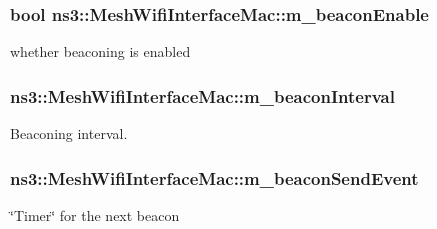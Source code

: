 \subsubsection[{\texorpdfstring{m\+\_\+beacon\+Enable}{m_beaconEnable}}]{\setlength{\rightskip}{0pt plus 5cm}bool ns3\+::\+Mesh\+Wifi\+Interface\+Mac\+::m\+\_\+beacon\+Enable\hspace{0.3cm}{\ttfamily [private]}}\hypertarget{classns3_1_1MeshWifiInterfaceMac_ab9019c324f1c01c06ce13bc137691c39}{}\label{classns3_1_1MeshWifiInterfaceMac_ab9019c324f1c01c06ce13bc137691c39}


whether beaconing is enabled 

\subsubsection[{\texorpdfstring{m\+\_\+beacon\+Interval}{m_beaconInterval}}]{ ns3\+::\+Mesh\+Wifi\+Interface\+Mac\+::m\+\_\+beacon\+Interval\hspace{0.3cm}{\ttfamily [private]}}\hypertarget{classns3_1_1MeshWifiInterfaceMac_a106e67903abbdb360b51ce457b6d315b}{}\label{classns3_1_1MeshWifiInterfaceMac_a106e67903abbdb360b51ce457b6d315b}


Beaconing interval. 

\subsubsection[{\texorpdfstring{m\+\_\+beacon\+Send\+Event}{m_beaconSendEvent}}]{ ns3\+::\+Mesh\+Wifi\+Interface\+Mac\+::m\+\_\+beacon\+Send\+Event\hspace{0.3cm}{\ttfamily [private]}}\hypertarget{classns3_1_1MeshWifiInterfaceMac_a631ce3de769470f4f3e4bf92a95c54ba}{}\label{classns3_1_1MeshWifiInterfaceMac_a631ce3de769470f4f3e4bf92a95c54ba}


\char`\"{}\+Timer\char`\"{} for the next beacon 

